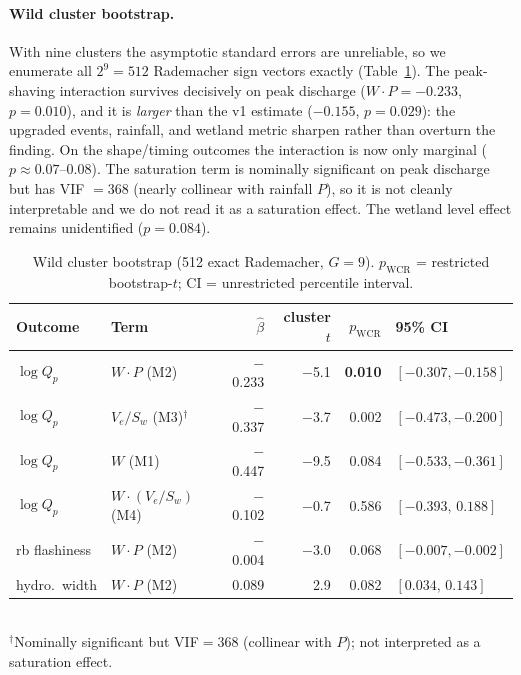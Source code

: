 \documentclass[11pt]{article}
\begin{document}
\paragraph{Wild cluster bootstrap.} With nine clusters the asymptotic standard errors are
unreliable, so we enumerate all $2^9=512$ Rademacher sign vectors exactly
(Table~\ref{tab:wcb}). The peak-shaving interaction survives decisively on peak discharge
($W\!\cdot\!P=-0.233$, $p=0.010$), and it is \emph{larger} than the v1 estimate ($-0.155$,
$p=0.029$): the upgraded events, rainfall, and wetland metric sharpen rather than overturn the
finding. On the shape/timing outcomes the interaction is now only marginal ($p\approx0.07$--$0.08$).
The saturation term is nominally significant on peak discharge but has VIF $=368$ (nearly collinear
with rainfall $P$), so it is not cleanly interpretable and we do not read it as a saturation effect.
The wetland level effect remains unidentified ($p=0.084$).

\begin{table}[htbp]\centering
\caption{Wild cluster bootstrap (512 exact Rademacher, $G=9$). $p_{\text{WCR}}$ = restricted
bootstrap-$t$; CI = unrestricted percentile interval.}
\label{tab:wcb}\small
\begin{tabular}{llrrrl}
\toprule
Outcome & Term & $\hat\beta$ & cluster $t$ & $p_{\text{WCR}}$ & 95\% CI \\
\midrule
$\log Q_p$      & $W\!\cdot\!P$ (M2)          & $-$0.233 & $-$5.1 & \textbf{0.010} & $[-0.307,-0.158]$ \\
$\log Q_p$      & $V_e/S_w$ (M3)$^{\dagger}$  & $-$0.337 & $-$3.7 & 0.002 & $[-0.473,-0.200]$ \\
$\log Q_p$      & $W$ (M1)                    & $-$0.447 & $-$9.5 & 0.084 & $[-0.533,-0.361]$ \\
$\log Q_p$      & $W\!\cdot\!(V_e/S_w)$ (M4)  & $-$0.102 & $-$0.7 & 0.586 & $[-0.393,\,0.188]$ \\
rb flashiness   & $W\!\cdot\!P$ (M2)          & $-$0.004 & $-$3.0 & 0.068 & $[-0.007,-0.002]$ \\
hydro.\ width   & $W\!\cdot\!P$ (M2)          & \phantom{-}0.089 & 2.9 & 0.082 & $[0.034,\,0.143]$ \\
\bottomrule
\end{tabular}
\\[2pt]
\footnotesize $^{\dagger}$Nominally significant but VIF$=368$ (collinear with $P$); not
interpreted as a saturation effect.
\end{table}
\end{document}
